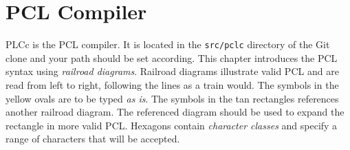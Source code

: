 \newcommand{\DiagramScale}{0.6}
\chapter{PCL Compiler}
PLCc is the PCL compiler. It is located in the \texttt{src/pclc} directory of the Git clone and your path should be set according. This chapter introduces the PCL syntax using \emph{railroad diagrams}. Railroad diagrams illustrate valid PCL and are read from left to right, following the lines as a train would. The symbols in the yellow ovals are to be typed \emph{as is}. The symbols in the tan rectangles references another railroad diagram. The referenced diagram should be used to expand the rectangle in more valid PCL. Hexagons contain \emph{character classes} and specify a range of characters that will be accepted.

